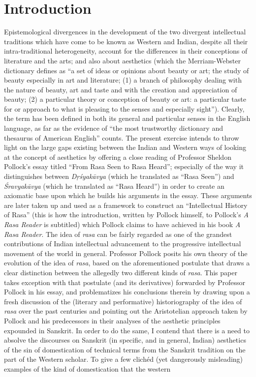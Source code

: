 \section*{Introduction}

Epistemological divergences in the development of the two divergent intellectual traditions which have come to be known as Western and Indian, despite all their intra-traditional heterogeneity, account for the differences in their conceptions of literature and the arts; and also about aesthetics (which the Merriam-Webster dictionary defines as “a set of ideas or opinions about beauty or art; the study of beauty especially in art and literature; (1) a branch of philosophy dealing with the nature of beauty, art and taste and with the creation and appreciation of beauty; (2) a particular theory or conception of beauty or art: a particular taste for or approach to what is pleasing to the senses and especially sight”). Clearly, the term has been defined in both its general and particular senses in the English language, as far as the evidence of “the most trustworthy dictionary and thesaurus of American English” counts. The present exercise intends to throw light on the large gaps existing between the Indian and Western ways of looking at the concept of aesthetics by offering a close reading of Professor Sheldon Pollock’s essay titled “From Rasa Seen to Rasa Heard”; especially of the way it distinguishes between \textsl{Dṛśyakāvya} (which he translated as “Rasa Seen”) and \textsl{Śravyakāvya} (which he translated as “Rasa Heard”) in order to create an axiomatic base upon which he builds his arguments in the essay. These arguments are later taken up and used as a framework to construct an “Intellectual History of Rasa” (this is how the introduction, written by Pollock himself, to Pollock’s \textsl{A Rasa Reader} is subtitled) which Pollock claims to have achieved in his book \textsl{A Rasa Reader}. The idea of \textsl{rasa} can be fairly regarded as one of the grandest contributions of Indian intellectual advancement to the progressive intellectual movement of the world in general. Professor Pollock posits his own theory of the evolution of the idea of \textsl{rasa}, based on the aforementioned postulate that draws a clear distinction between the allegedly two different kinds of \textsl{rasa}. This paper takes exception with that postulate (and its derivatives) forwarded by Professor Pollock in his essay, and problematizes his conclusions therein by drawing upon a fresh discussion of the (literary and performative) historiography of the idea of \textsl{rasa} over the past centuries and pointing out the Aristotelian approach taken by Pollock and his predecessors in their analyses of the aesthetic principles expounded in Sanskrit. In order to do the same, I contend that there is a need to absolve the discourses on Sanskrit (in specific, and in general, Indian) aesthetics of the sin of domestication of technical terms from the Sanskrit tradition on the part of the Western scholar. To give a few clichéd (yet dangerously misleading) examples of the kind of domestication that the western 